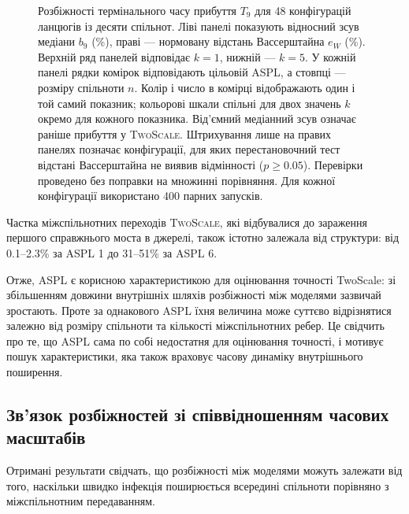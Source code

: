 \documentclass[a4paper,fleqn]{cas-sc}
\newcommand{\TS}{\textup{\textsc{TwoScale}}}
\newcommand{\eW}{e_{W}}
\begin{document}
\begin{figure}[tbp]
\caption{%
Розбіжності термінального часу
прибуття $T_9$ для 48 конфігурацій
ланцюгів із десяти спільнот.
Ліві панелі показують відносний зсув медіани
$b_9$ (\%), праві --- нормовану відстань
Вассерштайна $\eW$ (\%). Верхній ряд панелей
відповідає $k=1$, нижній --- $k=5$.
У кожній панелі рядки комірок відповідають
цільовій ASPL, а стовпці --- розміру спільноти $n$.
Колір і число в комірці відображають один і той самий
показник; кольорові шкали спільні для двох значень $k$
окремо для кожного показника.
Від'ємний медіанний зсув означає раніше прибуття у \TS{}.
Штрихування лише на правих панелях позначає
конфігурації, для яких перестановочний тест відстані
Вассерштайна не виявив відмінності ($p\geq0.05$).
Перевірки проведено без поправки
на множинні порівняння.
Для кожної конфігурації
використано 400 парних запусків.
}
\label{fig:accuracy_map}
\end{figure}

Частка міжспільнотних переходів
\TS{}, які відбувалися до зараження
першого справжнього моста в джерелі,
також істотно залежала від структури:
від 0.1--2.3\% за ASPL 1
до 31--51\% за ASPL 6.

Отже, ASPL є корисною характеристикою
для оцінювання точності TwoScale:
зі збільшенням довжини внутрішніх
шляхів розбіжності між моделями
зазвичай зростають. Проте за однакового
ASPL їхня величина може суттєво
відрізнятися залежно від розміру
спільноти та кількості міжспільнотних
ребер. Це свідчить про те, що ASPL
сама по собі недостатня для оцінювання
точності, і мотивує пошук характеристики,
яка також враховує часову динаміку
внутрішнього поширення.


\subsection{Зв'язок розбіжностей
зі співвідношенням часових масштабів}
\label{sec:res_descriptor}

Отримані результати свідчать,
що розбіжності між моделями
можуть залежати від того,
наскільки швидко інфекція
поширюється всередині спільноти
порівняно з міжспільнотним
передаванням.
\end{document}

